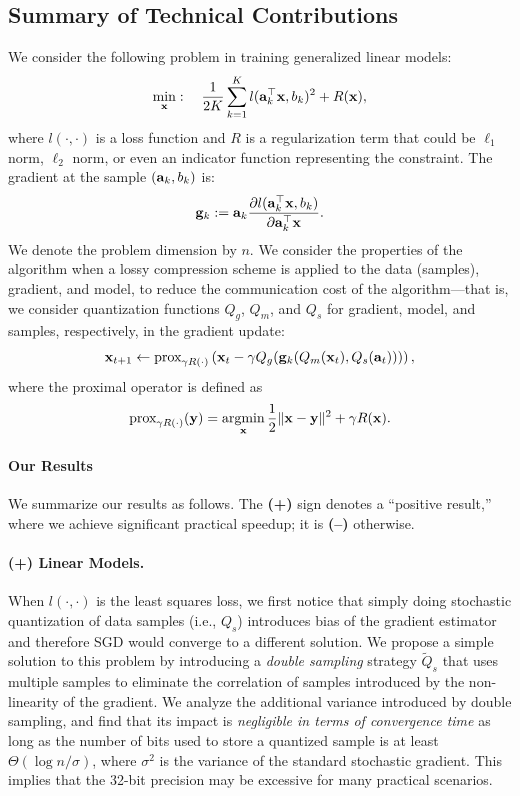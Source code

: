\documentclass{article}
\renewcommand{\vec}[1]{\mathbf{#1}}
\def\a{{\bf a}}
\def\g{{\bf g}}
\def\x{{\bf x}}
\def\y{{\bf y}}
\DeclareMathOperator*{\argmin}{argmin}
\begin{document}
\vspace{-1em}
\subsection{Summary of Technical Contributions}
\vspace{-0.5em}

We consider the following problem in training generalized linear models: 
\begin{align}
\min_{\x}:\quad {1\over 2K}\sum_{k=1}^K l(\a_k^\top \x, b_k)^2 + R(\x),
\label{eqn:leastsquares}
\end{align}
where $l(\cdot,\cdot)$ is a loss function and $R$ is a regularization term that could be $\ell_1$ norm, $\ell_2$ norm, or even an indicator function representing the constraint. 
The gradient at the sample $(\a_k, b_k)$ is: 
\[
\g_k := \a_k \frac{\partial l(\a_k^\top \x, b_k)}{\partial \a_k^\top \x} .
\]
We denote the problem dimension by $n$. 
We consider the properties of the algorithm when a lossy compression scheme is applied to the data (samples), 
gradient, and model, to reduce the communication cost of the algorithm---that is, we consider quantization functions $Q_g$, $Q_m$, and $Q_s$ for gradient, model, and samples, respectively, in the gradient update:
\begin{align}
\x_{t + 1} \leftarrow \text{prox}_{\gamma R(\cdot)}\left(\x_t - \gamma Q_g(\g_k (Q_m(\x_t), Q_s(\vec{a}_t)))\right),
\label{eq:proxupdate}
\end{align}
where the proximal operator is defined as
\[
\text{prox}_{\gamma R(\cdot)}(\y) =\argmin_{\x} {1\over 2}\|\x-\y\|^2 + \gamma R(\x).
\]

\vspace{-1.5em}
\paragraph{Our Results} We summarize our results as follows. The {\bf (+)}
sign denotes a ``positive result,'' where we achieve
significant practical speedup; it is {\bf (--)} otherwise.

\vspace{-1em}
\paragraph{(+) Linear Models.} When $l(\cdot,\cdot)$ is 
the least squares loss, we first notice that
simply doing stochastic quantization of data samples  
(i.e., $Q_s$) introduces bias of the gradient
estimator and therefore SGD would converge
to a different solution. We propose a simple
solution to this problem by introducing a
{\em double sampling} strategy
$\tilde{Q}_s$ that uses multiple samples to
eliminate the correlation of samples introduced
by the non-linearity of the gradient. We
analyze the additional variance introduced
by double sampling, and find that its impact is \emph{negligible in terms of convergence time} as long as the 
number of bits used to store a quantized sample is at least $\Theta( \log n / \sigma )$, 
where $\sigma^2$ is the variance of the standard stochastic gradient. 
This implies that the 32-bit precision may be excessive for many practical scenarios. 
\end{document}
